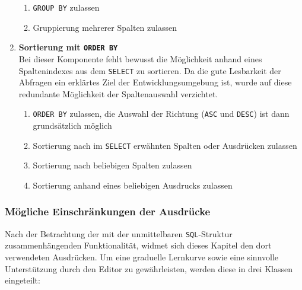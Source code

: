 \begin{enumerate}
  \begin{enumerate}[noitemsep]
  \item \label{feat:group-allow} \texttt{GROUP BY} zulassen
  \item \label{feat:group-multiple} Gruppierung mehrerer Spalten zulassen
  \end{enumerate}
\item \textbf{Sortierung mit \texttt{ORDER BY}} \\
  Bei dieser Komponente fehlt bewusst die Möglichkeit anhand eines Spaltenindexes aus dem \texttt{SELECT} zu sortieren. Da die gute Lesbarkeit der Abfragen ein erklärtes Ziel der Entwicklungsumgebung ist, wurde auf diese redundante Möglichkeit der Spaltenauswahl verzichtet.
  \begin{enumerate}[noitemsep]
  \item \label{feat:order-allow} \texttt{ORDER BY} zulassen, die Auswahl der Richtung (\texttt{ASC} und \texttt{DESC}) ist dann grundsätzlich möglich
  \item \label{feat:order-select} Sortierung nach im \texttt{SELECT} erwähnten Spalten oder Ausdrücken zulassen
  \item \label{feat:order-any-column} Sortierung nach beliebigen Spalten zulassen
  \item \label{feat:order-expression} Sortierung anhand eines beliebigen Ausdrucks zulassen
  \end{enumerate}
\end{enumerate}

\subsubsection{Mögliche Einschränkungen der Ausdrücke}
\label{sec:sql-subset-expression}

Nach der Betrachtung der mit der unmittelbaren \texttt{SQL}-Struktur zusammenhängenden Funktionalität, widmet sich dieses Kapitel den dort verwendeten Ausdrücken. Um eine graduelle Lernkurve sowie eine sinnvolle Unterstützung durch den Editor zu gewährleisten, werden diese in drei Klassen eingeteilt:

